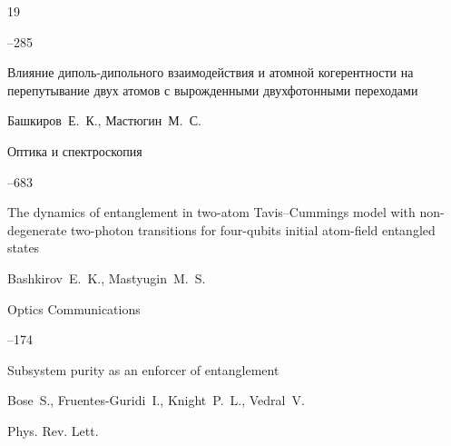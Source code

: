 \begin{thebibliography}{19}


--285





\paper  Влияние диполь-дипольного взаимодействия и атомной когерентности на перепутывание двух атомов с вырожденными двухфотонными переходами

\by Башкиров~Е.~К., Мастюгин~М.~С.

\jour Оптика и спектроскопия




--683











\paper The dynamics of entanglement in two-atom Tavis--Cummings model with non-degenerate two-photon transitions for four-qubits initial atom-field entangled states

\by  Bashkirov~E.~K.,  Mastyugin~M.~S.

\jour Optics Communications



--174







\paper Subsystem purity as an  enforcer of entanglement

\by   Bose~S.,  Fruentes-Guridi~I.,  Knight~P.~L.,  Vedral~V.

\jour Phys. Rev. Lett.



\end{thebibliography}
